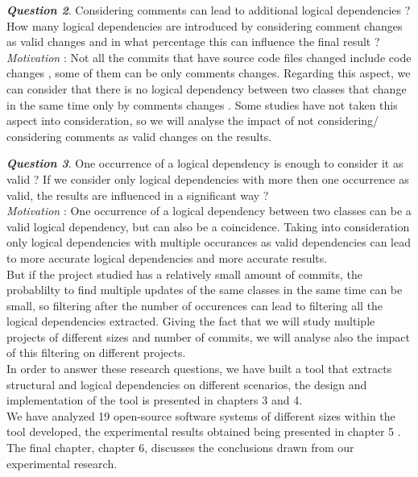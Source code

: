 \textit{\textbf{Question 2}}. Considering comments can lead to additional logical dependencies ? How many logical dependencies are introduced by considering comment changes as valid changes and in what percentage this can influence the final result ?\\
\textit{Motivation} : Not all the commits that have source code files changed include code changes , some of them can be only comments changes. Regarding this aspect, we can consider that there is no logical dependency between two classes that change in the same time only by comments changes . Some studies have not taken this aspect into consideration, so we will analyse the impact of not considering/ considering comments as valid changes on the results. 


\textit{\textbf{Question 3}}. One occurrence of a logical dependency is enough to consider it as valid ? If we consider only logical dependencies with more then one occurrence as valid, the results are influenced in a significant way ?\\
\textit{Motivation} : One occurrence of a logical dependency between two classes can be a valid logical dependency, but can also be a coincidence. Taking into consideration only logical dependencies with multiple occurances as valid dependencies can lead to more accurate logical dependencies and more accurate results.\\ But if the project studied has a relatively small amount of commits, the probablilty to find multiple updates of the same classes in the same time can be small, so filtering after the number of occurences can lead to filtering all the logical dependencies extracted. Giving the fact that we will study multiple projects of different sizes and number of commits, we will analyse also the impact of this filtering on different projects.\\

\tab In order to answer these research questions, we have built a tool that extracts structural and logical dependencies on different scenarios, the design and implementation of the tool is presented in chapters 3 and 4.\\
\tab We have analyzed 19 open-source software systems of different sizes within the tool developed, the experimental results obtained being presented in chapter 5 . The final chapter, chapter 6, discusses the conclusions drawn from our experimental 
research.

